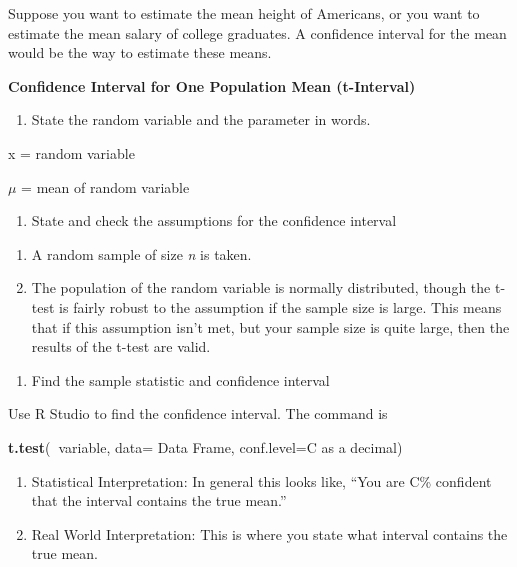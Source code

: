 \documentclass[
]{book}
\newenvironment{Shaded}{\begin{snugshade}}{\end{snugshade}}
\newcommand{\DataTypeTok}[1]{\textcolor[rgb]{0.13,0.29,0.53}{#1}}
\newcommand{\KeywordTok}[1]{\textcolor[rgb]{0.13,0.29,0.53}{\textbf{#1}}}
\newcommand{\NormalTok}[1]{#1}
\newcommand{\OperatorTok}[1]{\textcolor[rgb]{0.81,0.36,0.00}{\textbf{#1}}}
\providecommand{\tightlist}{%
  \setlength{\itemsep}{0pt}\setlength{\parskip}{0pt}}
\begin{document}
Suppose you want to estimate the mean height of Americans, or you want to estimate the mean salary of college graduates. A confidence interval for the mean would be the way to estimate these means.

\textbf{Confidence Interval for One Population Mean (t-Interval)}

\begin{enumerate}
\def\labelenumi{\arabic{enumi}.}
\tightlist
\item
  State the random variable and the parameter in words.
\end{enumerate}

x = random variable

\(\mu\) = mean of random variable

\begin{enumerate}
\def\labelenumi{\arabic{enumi}.}
\setcounter{enumi}{1}
\tightlist
\item
  State and check the assumptions for the confidence interval
\end{enumerate}

\begin{enumerate}
\def\labelenumi{\alph{enumi}.}
\item
  A random sample of size \emph{n} is taken.
\item
  The population of the random variable is normally distributed, though the t-test is fairly robust to the assumption if the sample size is large. This means that if this assumption isn't met, but your sample size is quite large, then the results of the t-test are valid.
\end{enumerate}

\begin{enumerate}
\def\labelenumi{\arabic{enumi}.}
\setcounter{enumi}{2}
\tightlist
\item
  Find the sample statistic and confidence interval
\end{enumerate}

Use R Studio to find the confidence interval. The command is

\begin{Shaded}
\begin{Highlighting}[]
\KeywordTok{t.test}\NormalTok{(}\OperatorTok{~}\NormalTok{variable, }\DataTypeTok{data=}\NormalTok{ Data Frame, }\DataTypeTok{conf.level=}\NormalTok{C as a decimal)}
\end{Highlighting}
\end{Shaded}

\begin{enumerate}
\def\labelenumi{\arabic{enumi}.}
\setcounter{enumi}{3}
\item
  Statistical Interpretation: In general this looks like, ``You are C\% confident that the interval contains the true mean.''
\item
  Real World Interpretation: This is where you state what interval contains the true mean.
\end{enumerate}
\end{document}

